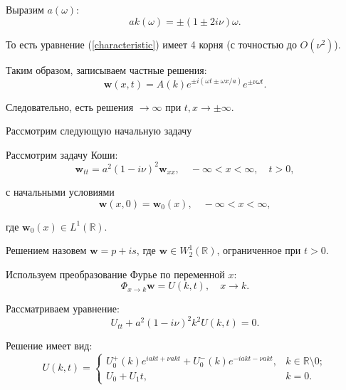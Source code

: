 \documentclass{article}
\begin{document}
Выразим $a(\omega)$:
\begin{equation*}
    ak(\omega) = \pm (1 \pm 2 i \nu) \omega.
\end{equation*}

То есть уравнение (\ref{characteristic}) имеет 4 корня (с точностью до $O(\nu^2)$).

Таким образом, записываем частные решения:
\begin{equation*}
    \mathbf{w}(x,t) = A(k) e^{\pm i(\omega t \pm \omega x/a)} e^{\pm \nu \omega t}.
\end{equation*}

Следовательно, есть решения $\to \infty$ при $t, x \to \pm\infty$.



Рассмотрим следующую начальную задачу

Рассмотрим задачу Коши:
\begin{equation}
    \mathbf{w}_{tt} = a^2 (1 - i \nu)^2 \mathbf{w}_{xx}, \quad -\infty < x < \infty, \quad t > 0,
\end{equation}

с начальными условиями
\begin{equation*}
    \mathbf{w}(x,0) = \mathbf{w}_0(x), \quad -\infty < x < \infty,
\end{equation*}

где $\mathbf{w}_0(x) \in L^1(\mathbb{R})$.

Решением назовем $\mathbf{w} = p + i s$, где $\mathbf{w} \in W^1_2(\mathbb{R})$, ограниченное при $t > 0$.

Используем преобразование Фурье по переменной $x$:
\begin{equation*}
    \Phi_{x \to k} \mathbf{w} = U(k,t), \quad x \to k.
\end{equation*}

Рассматриваем уравнение:
\begin{equation*}
    U_{tt} + a^2 (1 - i\nu)^2 k^2 U(k,t) = 0.
\end{equation*}

Решение имеет вид:
\begin{equation*}
    U(k,t) =
	\begin{cases}
     U_0^+(k) e^{i a k t + \nu a k t} + U_0^-(k) e^{-i a k t - \nu a k t}, & k \in \mathbb{R} \setminus 0;\\
     U_0 + U_1 t,  & k =0.
     \end{cases}
\end{equation*}
\end{document}
